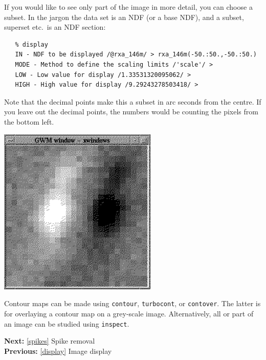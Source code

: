 \documentclass[11pt]{article}
\newcommand{\htmladdimg}[1]{}
\newenvironment{latexonly}{}{}
\newcommand{\htmlref}[2]{#1}
\newcommand{\xref}[3]{#1}
\begin{document}
   If you would like to see only part of the image in more detail,
   you can choose a subset. In the jargon the data set is an
\htmlref{NDF}{glossndf}
   (or a base NDF), and a subset, superset etc.\ is an
\htmlref{NDF section:}{glossndfsection}

\begin{verbatim}
   % display
   IN - NDF to be displayed /@rxa_146m/ > rxa_146m(-50.:50.,-50.:50.)
   MODE - Method to define the scaling limits /'scale'/ >
   LOW - Low value for display /1.33531320095062/ >
   HIGH - High value for display /9.29243278503418/ >
\end{verbatim}

   Note that the decimal points make this a subset in arc seconds from
   the centre. If you leave out the decimal points, the numbers would be
   counting the pixels from the bottom left.

\begin{latexonly}
\begin{center}
\leavevmode\includegraphics[height=80mm]{sc1_display3}
\end{center}
\end{latexonly}
\htmladdimg{addon/display3.gif}

   Contour maps can be made using
{\tt \xref{contour}{sun95}{CONTOUR}},
{\tt \xref{turbocont}{sun95}{TURBOCONT}},
   or
{\tt \xref{contover}{sun95}{CONTOVER}}.
   The latter is for overlaying a contour map on a grey-scale image.
   Alternatively, all or part of an image can be studied using
{\tt \xref{inspect}{sun95}{INSPECT}}.

\begin{latexonly}
{\bf Next:} \ref{spikes} Spike removal\\
{\bf Previous:} \ref{display} Image display\\
\end{latexonly}
\end{document}
